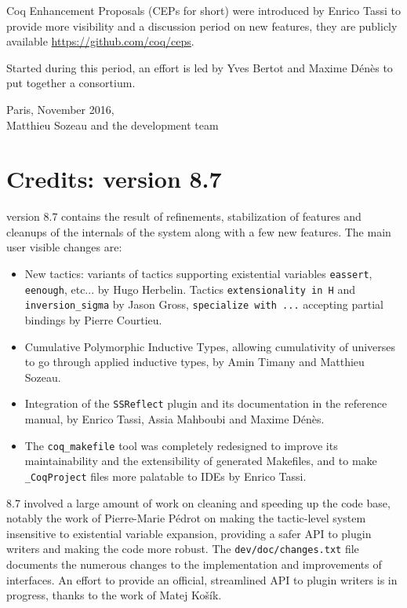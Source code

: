 Coq Enhancement Proposals (CEPs for short) were introduced by Enrico
Tassi to provide more visibility and a discussion period on new
features, they are publicly available \url{https://github.com/coq/ceps}.

Started during this period, an effort is led by Yves Bertot and Maxime
Dénès to put together a {\Coq} consortium.

\begin{flushright}
Paris, November 2016,\\
Matthieu Sozeau and the {\Coq} development team\\
\end{flushright}

\section*{Credits: version 8.7}

{\Coq} version 8.7 contains the result of refinements, stabilization of
features and cleanups of the internals of the system along with a few
new features. The main user visible changes are:
\begin{itemize}
\item New tactics: variants of tactics supporting existential variables
  \texttt{eassert}, \texttt{eenough}, etc... by Hugo Herbelin. Tactics
  \texttt{extensionality in H} and \texttt{inversion\_sigma} by Jason
  Gross, \texttt{specialize with ...} accepting partial bindings by
  Pierre Courtieu.
\item Cumulative Polymorphic Inductive Types, allowing cumulativity of
  universes to go through applied inductive types, by Amin Timany and
  Matthieu Sozeau.
\item Integration of the \texttt{SSReflect} plugin and its documentation in the
  reference manual, by Enrico Tassi, Assia Mahboubi and Maxime Dénès.
\item The \texttt{coq\_makefile} tool was completely redesigned to improve its
  maintainability and the extensibility of generated Makefiles, and to
  make \texttt{\_CoqProject} files more palatable to IDEs by Enrico Tassi.
\end{itemize}

{\Coq} 8.7 involved a large amount of work on cleaning and speeding up
the code base, notably the work of Pierre-Marie Pédrot on making the
tactic-level system insensitive to existential variable expansion,
providing a safer API to plugin writers and making the code more
robust. The \texttt{dev/doc/changes.txt} file documents the numerous
changes to the implementation and improvements of interfaces. An effort
to provide an official, streamlined API to plugin writers is in
progress, thanks to the work of Matej Košík.

